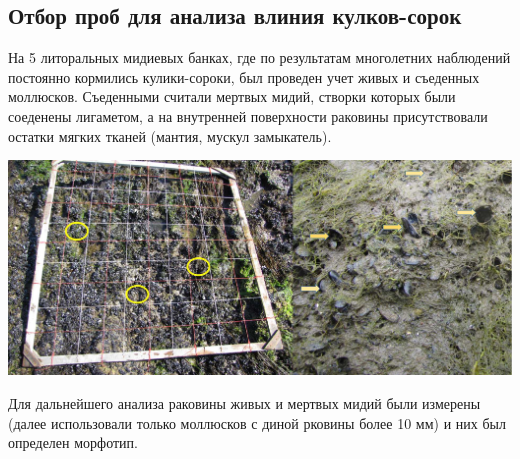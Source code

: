\documentclass[a0,portrait]{a0poster}
\begin{document}
\begin{minipage}[t]{0.5\linewidth}
\subsection*{Отбор проб для анализа влиния кулков-сорок}

%
\begin{minipage}[t]{0.4\linewidth}
На 5 литоральных мидиевых банках, где по результатам многолетних наблюдений постоянно кормились кулики-сороки, был проведен учет живых и съеденных моллюсков. Съеденными считали мертвых мидий, створки которых были соеденены лигаметом, а на внутренней поверхности раковины присутствовали остатки мягких тканей (мантия, мускул замыкатель).  
\end{minipage}\hspace{1cm}
%
\begin{minipage}[t]{0.5\linewidth}		
	\begin{center}\vspace{0.1cm}
			\includegraphics[width=0.8\linewidth]{Samples_oystercatchers.jpg}
			\label{Fig_setup}
		\end{center}
\end{minipage}

\vspace{0.5cm}


Для дальнейшего анализа раковины живых и мертвых мидий были измерены (далее использовали только моллюсков с диной рковины более 10 мм) и них был определен морфотип.  



\end{minipage}


\end{document}
